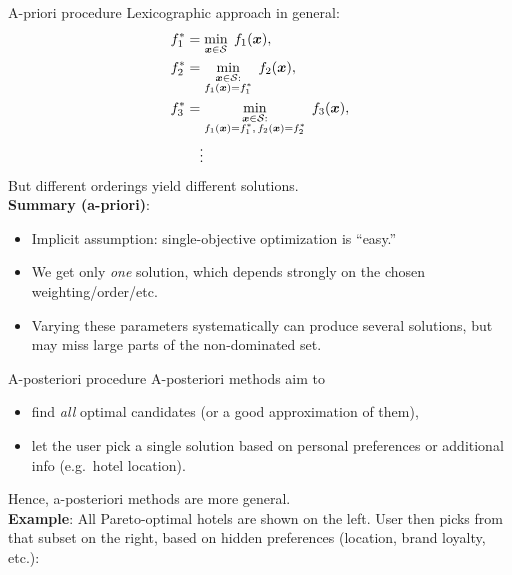 \documentclass[11pt,compress,t,notes=noshow,xcolor=table]{beamer}
\begin{document}
\begin{framev}[fs=small]{A-priori procedure}
Lexicographic approach in general:
$$
\begin{aligned}
f_1^* &= \min_{\bm{x} \in \mathcal{S}} \;f_1(\bm{x}),\\
f_2^* &= \min_{\substack{\bm{x} \in \mathcal{S}:\\ f_1(\bm{x})=f_1^*}} \;f_2(\bm{x}),\\
f_3^* &= \min_{\substack{\bm{x} \in \mathcal{S}:\\ f_1(\bm{x})=f_1^*,\,f_2(\bm{x})=f_2^*}}
\;f_3(\bm{x}),\\
&\quad\vdots
\end{aligned}
$$
But different orderings yield different solutions.\\
\spacer
\textbf{Summary (a-priori)}:
\begin{itemize}\setlength{\itemsep}{0.7em}
\item Implicit assumption: single-objective optimization is ``easy.''
\item We get only \emph{one} solution, which depends strongly on the chosen weighting/order/etc.
\item Varying these parameters systematically can produce several solutions, but may miss large parts of the non-dominated set.
\end{itemize}
\end{framev}


\begin{framev}[fs=footnotesize]{A-posteriori procedure}
A-posteriori methods aim to
\begin{itemize}
\item find \emph{all} optimal candidates (or a good approximation of them),
\item let the user pick a single solution based on personal preferences or
additional info (e.g.\ hotel location).
\end{itemize}
Hence, a-posteriori methods are more general.\\
\spacer
\textbf{Example}:
All Pareto-optimal hotels are shown on the left.
User then picks from that subset on the right, based on hidden preferences
(location, brand loyalty, etc.):
\end{framev}

\endlecture
\end{document}
